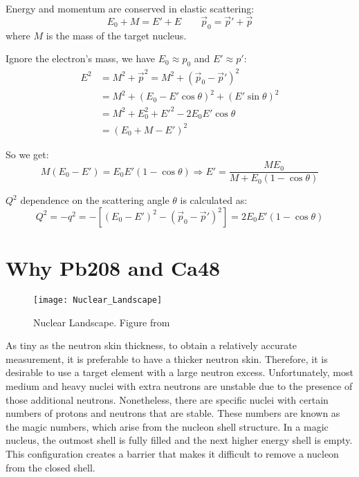 Energy and momentum are conserved in elastic scattering:
$$ E_0 + M = E' + E \qquad \vec{p}_0 = \vec{p}' + \vec{p} $$
where $M$ is the mass of the target nucleus.

Ignore the electron's mass, we have $E_0 \approx p_0$ and $E' \approx p'$:
\begin{equation}
    \begin{aligned}
	E^2 &= M^2 + \vec{p}^2 = M^2 + (\vec{p}_0 - \vec{p}')^2  \\
	    &= M^2 + (E_0 - E'\cos\theta)^2 + (E'\sin\theta)^2	\\
	    &= M^2 + E_0^2 + E'^2 - 2E_0E'\cos\theta	\\
	    &= (E_0 + M - E')^2
    \end{aligned}
\end{equation}

So we get:
\begin{equation}
    M(E_0 - E') = E_0E'(1-\cos\theta)   \Longrightarrow
    E' = \frac{ME_0}{M + E_0(1-\cos\theta)}
\label{eq:scattered_energy}
\end{equation}

$Q^2$ dependence on the scattering angle $\theta$ is calculated as:
\begin{equation}
    Q^2 = -q^2 = -[(E_0 - E')^2 - (\vec{p}_0 - \vec{p}')^2] = 2E_0E'(1-\cos\theta)
    \label{eq:Q2}
\end{equation}

\section{Why Pb208 and Ca48}
\begin{figure}[!h]
    \centering
    \texttt{[image: Nuclear\_Landscape]}
    \caption{Nuclear Landscape. Figure from \cite{osti_1375323}}
    \label{fig:nuclear_landscape}
\end{figure}
As tiny as the neutron skin thickness, to obtain a relatively accurate measurement, it is
preferable to have a thicker neutron skin. Therefore, it is desirable to use a
target element with a large neutron excess. Unfortunately, most medium and heavy nuclei 
with extra neutrons are unstable due to the presence of those additional neutrons. 
Nonetheless, there are specific nuclei with certain numbers of protons and neutrons that are stable. 
These numbers are known as the magic numbers, which arise from the nucleon 
shell structure. In a magic nucleus, the outmost shell is fully filled and the 
next higher energy shell is empty. This configuration creates a barrier that makes it difficult to remove a nucleon from the closed shell.

